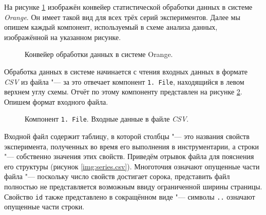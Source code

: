 На рисунке \ref{img:series30} изображён конвейер статистической обработки данных в системе \textit{Orange}. Он имеет такой вид для всех трёх серий экспериментов. Далее мы опишем каждый компонент, используемый в схеме анализа данных, изображённой на указанном рисунке.

\begin{figure}[H]
    \caption{Конвейер обработки данных в системе Orange.}
    \label{img:series30}
\end{figure}

Обработка данных в системе начинается с чтения входных данных в формате \textit{CSV} из файла "--- за это отвечает компонент \texttt{1.\,File}, находящийся в левом верхнем углу схемы. Отчёт по этому компоненту представлен на рисунке \ref{img:1-File}. Опишем формат входного файла.

\begin{figure}[H]
    \caption{Компонент \texttt{1.\,File}. Входные данные в файле \textit{CSV}.}
    \label{img:1-File}
\end{figure}

Входной файл содержит таблицу, в которой столбцы "--- это названия свойств эксперимента, полученных во время его выполнения в инструментарии, а строки "--- собственно значения этих свойств. Приведём отрывок файла для пояснения его структуры (рисунок \ref{img:series.csv}). Многоточия означают опущенные части файла "--- поскольку число свойств достигает сорока, представить файл полностью не представляется возможным ввиду ограниченной ширины страницы. Свойство \texttt{id} также представлено в сокращённом виде "--- символы \texttt{..} означают опущенные части строки.


